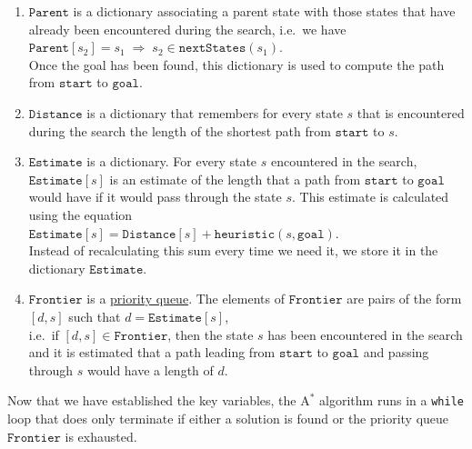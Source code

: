 \begin{enumerate}
\item $\mathtt{Parent}$ is a dictionary associating a parent state with those states that have already been
      encountered during the search, i.e.~we have
      \\[0.2cm]
      \hspace*{1.3cm}
      $\mathtt{Parent}[s_2] = s_1 \;\Rightarrow\; s_2 \in \mathtt{nextStates}(s_1)$.
      \\[0.2cm]
      Once the goal has been found, this dictionary is used to compute the path from $\mathtt{start}$ to
      $\mathtt{goal}$. 
\item $\mathtt{Distance}$ is a dictionary that remembers for every state $s$ that is encountered during the
      search the length of the shortest path from $\mathtt{start}$ to $s$.
\item $\mathtt{Estimate}$ is a dictionary.  For every state $s$ encountered in the search, $\mathtt{Estimate}[s]$
      is an estimate of the length that a path from $\mathtt{start}$ to $\mathtt{goal}$ would have if it would
      pass through the state $s$.  This estimate is calculated using the equation
      \\[0.2cm]
      \hspace*{1.3cm}
      $\mathtt{Estimate}[s] = \mathtt{Distance}[s] + \mathtt{heuristic}(s, \mathtt{goal})$.
      \\[0.2cm]
      Instead of recalculating this sum every time we need it, we store it in the dictionary
      $\mathtt{Estimate}$.
\item $\mathtt{Frontier}$ is a \href{https://en.wikipedia.org/wiki/Priority_queue}{priority queue}.
      The elements of $\mathtt{Frontier}$ are pairs of the form
      \\[0.2cm]
      \hspace*{1.3cm}
      $[d, s]$ \quad such that \quad $d = \mathtt{Estimate}[s]$,
      \\[0.2cm]
      i.e.~if $[d, s] \in \mathtt{Frontier}$, then the state $s$ has been encountered in the search and it is
      estimated that a path leading from $\mathtt{start}$ to $\mathtt{goal}$ and passing through $s$ would have
      a length of $d$.
\end{enumerate}
Now that we have established the key variables, the $\mathrm{A}^*$ algorithm runs in a \texttt{while} loop that
does only terminate if either a solution is found or the priority queue $\mathtt{Frontier}$ is exhausted.

